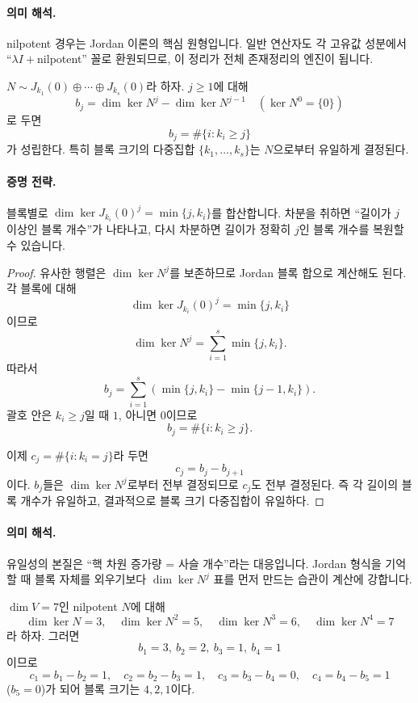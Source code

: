 \paragraph{의미 해석.}
nilpotent 경우는 Jordan 이론의 핵심 원형입니다. 일반 연산자도 각 고유값 성분에서 ``$\lambda I+$nilpotent'' 꼴로 환원되므로, 이 정리가 전체 존재정리의 엔진이 됩니다.

\begin{theorem}
$N\sim J_{k_1}(0)\oplus\cdots\oplus J_{k_s}(0)$라 하자. $j\ge1$에 대해
$$
b_j=\dim\ker N^j-\dim\ker N^{j-1}\quad(\ker N^0=\{0\})
$$
로 두면
$$
b_j=\#\{i: k_i\ge j\}
$$
가 성립한다. 특히 블록 크기의 다중집합 $\{k_1,\dots,k_s\}$는 $N$으로부터 유일하게 결정된다.
\end{theorem}

\paragraph{증명 전략.}
블록별로 $\dim\ker J_{k_i}(0)^j=\min\{j,k_i\}$를 합산합니다. 차분을 취하면 ``길이가 $j$ 이상인 블록 개수''가 나타나고, 다시 차분하면 길이가 정확히 $j$인 블록 개수를 복원할 수 있습니다.

\begin{proof}
유사한 행렬은 $\dim\ker N^j$를 보존하므로 Jordan 블록 합으로 계산해도 된다. 각 블록에 대해
$$
\dim\ker J_{k_i}(0)^j=\min\{j,k_i\}
$$
이므로
$$
\dim\ker N^j=\sum_{i=1}^s \min\{j,k_i\}.
$$
따라서
$$
b_j=\sum_{i=1}^s\left(\min\{j,k_i\}-\min\{j-1,k_i\}\right).
$$
괄호 안은 $k_i\ge j$일 때 $1$, 아니면 $0$이므로
$$
b_j=\#\{i:k_i\ge j\}.
$$

이제 $c_j=\#\{i:k_i=j\}$라 두면
$$
c_j=b_j-b_{j+1}
$$
이다. $b_j$들은 $\dim\ker N^j$로부터 전부 결정되므로 $c_j$도 전부 결정된다. 즉 각 길이의 블록 개수가 유일하고, 결과적으로 블록 크기 다중집합이 유일하다.
\end{proof}

\paragraph{의미 해석.}
유일성의 본질은 ``핵 차원 증가량 = 사슬 개수''라는 대응입니다. Jordan 형식을 기억할 때 블록 자체를 외우기보다 $\dim\ker N^j$ 표를 먼저 만드는 습관이 계산에 강합니다.

\begin{example}
$\dim V=7$인 nilpotent $N$에 대해
$$
\dim\ker N=3,\quad \dim\ker N^2=5,\quad \dim\ker N^3=6,\quad \dim\ker N^4=7
$$
라 하자. 그러면
$$
b_1=3,\ b_2=2,\ b_3=1,\ b_4=1
$$
이므로
$$
c_1=b_1-b_2=1,\quad c_2=b_2-b_3=1,\quad c_3=b_3-b_4=0,\quad c_4=b_4-b_5=1
$$
($b_5=0$)가 되어 블록 크기는 $4,2,1$이다.
\end{example}

